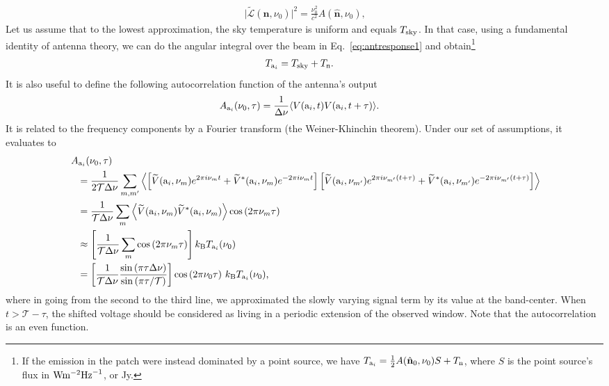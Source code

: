 \documentclass[11pt]{article}
\numberwithin{equation}{section}
\newcommand{\bt}[1]{\mathbf{#1}}
\newcommand{\wt}[1]{\widetilde{#1}}
\newcommand{\kb}{k_{\rm B}}
\begin{document}
\begin{align}
  \vert \wt{\mathcal{L}}(\hat{\bt n}, \nu_0) \vert^2 = \frac{\nu_0^2}{c^2} A(\hat{\bt n}, \nu_0) \mbox{,}
\end{align}
Let us assume that to the lowest approximation, the sky temperature is uniform and equals $T_{\rm sky}$. In that case, using a fundamental identity of antenna theory, we can do the angular integral over the beam in Eq.~\eqref{eq:antresponse1} and obtain\footnote{If the emission in the patch were instead dominated by a point source, we have $T_{{\rm a}_i} = \frac{1}{2} A(\hat{\bt n}_0, \nu_0) S + T_{\rm n}$, where $S$ is the point source's flux in ${\rm W} {\rm m}^{-2} {\rm Hz}^{-1}$, or Jy.}
\begin{align}
  T_{{\rm a}_i} & = T_{\rm sky} + T_{\rm n} \mbox{.} \label{eq:anttemp2}
\end{align}
It is also useful to define the following autocorrelation function of the antenna's output
\begin{align}
  A_{{\rm a}_i}(\nu_0, \tau) & = \frac{1}{\Delta\nu} \langle V({\rm a}_i, t) V({\rm a}_i, t + \tau) \rangle \mbox{.} \label{eq:autocorrdef}
\end{align}
It is related to the frequency components by a Fourier transform (the Weiner-Khinchin theorem). Under our set of assumptions, it evaluates to
\begin{align}
~~~ & \!\!\!\!
  A_{{\rm a}_i}(\nu_0, \tau) \nonumber \\
  & = \frac{1}{2 \mathcal{T} \Delta\nu } \sum_{m, m^\prime} \left\langle \left[ \wt{V}({\rm a}_i, \nu_m) e^{2\pi i \nu_m t} + \wt{V}^\ast({\rm a}_i, \nu_m) e^{-2\pi i \nu_m t} \right] \left[ \wt{V}({\rm a}_i, \nu_{m^\prime}) e^{2\pi i \nu_{m^\prime} (t + \tau)} + \wt{V}^\ast({\rm a}_i, \nu_{m^\prime}) e^{-2\pi i \nu_{m^\prime} (t + \tau)} \right] \right\rangle \notag \\
  & = \frac{1}{\mathcal{T} \Delta\nu} \sum_{m} \left\langle \wt{V}({\rm a}_i, \nu_m) \wt{V}^\ast({\rm a}_i, \nu_m) \right\rangle \cos{(2\pi \nu_m \tau)} \notag \\
  & \approx \left[ \frac{1}{\mathcal{T} \Delta\nu} \sum_{m} \cos{(2\pi \nu_m \tau)} \right] \kb T_{{\rm a}_i}(\nu_0)   \notag \\
  & = \left[ \frac{1}{\mathcal{T} \Delta\nu} \frac{ \sin{(\pi \tau \Delta\nu)} }{ \sin{(\pi \tau/\mathcal{T})} } \right] \cos{(2 \pi \nu_0 \tau)} \ \kb T_{{\rm a}_i}(\nu_0) \mbox{,} \label{eq:autocorr}
\end{align}
where in going from the second to the third line, we approximated the slowly varying signal term by its value at the band-center. When $t > \mathcal{T} - \tau$, the shifted voltage should be considered as living in a periodic extension of the observed window. Note that the autocorrelation is an even function.
\end{document}
